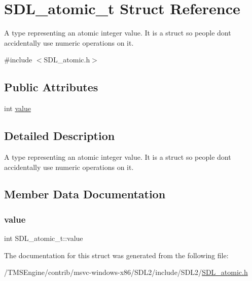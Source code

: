 \hypertarget{struct_s_d_l__atomic__t}{}\section{S\+D\+L\+\_\+atomic\+\_\+t Struct Reference}
\label{struct_s_d_l__atomic__t}


A type representing an atomic integer value. It is a struct so people don\textquotesingle{}t accidentally use numeric operations on it.  




{\ttfamily \#include $<$S\+D\+L\+\_\+atomic.\+h$>$}

\subsection*{Public Attributes}
\begin{DoxyCompactItemize}
\item 
int \hyperlink{struct_s_d_l__atomic__t_a0d09ddf3cc5798c709edb7cea104203a}{value}
\end{DoxyCompactItemize}


\subsection{Detailed Description}
A type representing an atomic integer value. It is a struct so people don\textquotesingle{}t accidentally use numeric operations on it. 

\subsection{Member Data Documentation}
\mbox{\label{struct_s_d_l__atomic__t_a0d09ddf3cc5798c709edb7cea104203a}} 
\subsubsection{\texorpdfstring{value}{value}}
{\footnotesize\ttfamily int S\+D\+L\+\_\+atomic\+\_\+t\+::value}



The documentation for this struct was generated from the following file\+:\begin{DoxyCompactItemize}
\item 
/\+T\+M\+S\+Engine/contrib/msvc-\/windows-\/x86/\+S\+D\+L2/include/\+S\+D\+L2/\hyperlink{_s_d_l__atomic_8h}{S\+D\+L\+\_\+atomic.\+h}\end{DoxyCompactItemize}
